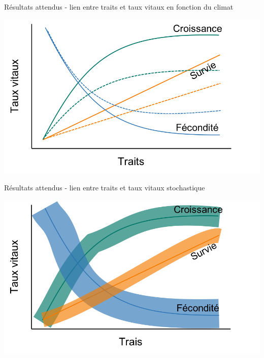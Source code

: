 \documentclass[11pt, compress, aspectratio=1610]{beamer}
\begin{document}
\begin{frame}{Résultats attendus - lien entre traits et taux vitaux en
fonction du climat}
\protect\hypertarget{ruxe9sultats-attendus---lien-entre-traits-et-taux-vitaux-en-fonction-du-climat}{}

\centering

\includegraphics[scale=0.55]{figures/output_chap1a.png}

\par

\end{frame}

\begin{frame}{Résultats attendus - lien entre traits et taux vitaux
stochastique}
\protect\hypertarget{ruxe9sultats-attendus---lien-entre-traits-et-taux-vitaux-stochastique}{}

\centering

\includegraphics[scale=0.55]{figures/output_chap1b.png}

\par

\end{frame}
\end{document}
